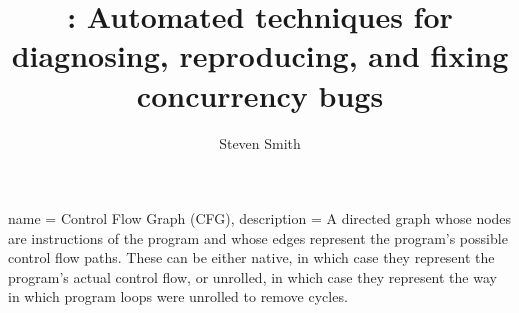 {
  name = Control Flow Graph (CFG),
  description = {A directed graph whose nodes are instructions
    of the program and whose edges represent the program's possible
    control flow paths.  These can be either native, in which
    case they represent the program's actual control flow, or
    unrolled, in which case they represent the way in which program
    loops were unrolled to remove cycles.
  }
}

    
\makeglossaries

\author{Steven Smith}
\title{{\Technique}: Automated techniques for diagnosing, reproducing, and fixing concurrency bugs}
